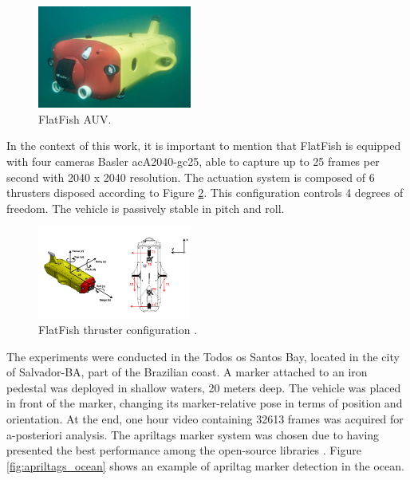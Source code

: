 \documentclass[conference, letterpaper]{IEEEtran}
\begin{document}
\begin{figure}[!ht]
    \centering
    \includegraphics[width=0.45\textwidth]{./fig/20160317-FF-Test-P1040442.jpg}
    \caption{FlatFish AUV.}
    \label{fig:flatfish_1}
\end{figure}

In the context of this work, it is important to mention that FlatFish is
equipped with four cameras Basler acA2040-gc25, able to capture up to 25 frames
per second with 2040 x 2040 resolution. The actuation system is composed of 6
thrusters disposed according to Figure \ref{fig:thrusters_configuration}. This
configuration controls 4 degrees of freedom. The vehicle is passively stable
in pitch and roll.

\begin{figure}[!ht]
    \centering
    \includegraphics[width=0.45\textwidth]{./fig/thrust_configuration.png}
    \caption{FlatFish thruster configuration \cite{saback2016}.}
    \label{fig:thrusters_configuration}
\end{figure}

The experiments were conducted in the Todos os Santos Bay, located in the city
of Salvador-BA, part of the Brazilian coast. A marker attached to an iron
pedestal was deployed in shallow waters, 20 meters deep. The vehicle was
placed in front of the marker, changing its marker-relative pose in terms of
position and orientation. At the end, one hour video containing 32613 frames was
acquired for a-posteriori analysis. The apriltags marker system was chosen due
to having presented the best performance among the open-source libraries
\cite{diego}.  Figure \ref{fig:apriltags_ocean} shows an example of apriltag marker detection
in the ocean.
\end{document}

